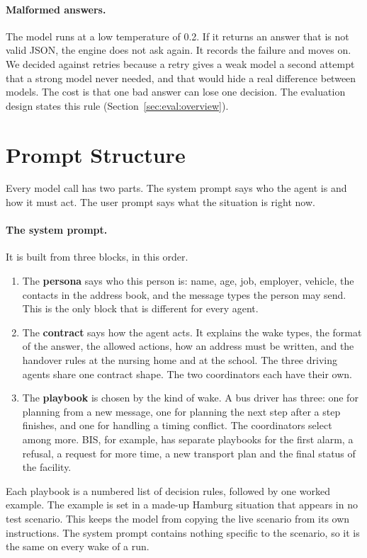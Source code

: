 \paragraph{Malformed answers.} The model runs at a low temperature of 0.2. If
it returns an answer that is not valid JSON, the engine does not ask again. It
records the failure and moves on. We decided against retries because a retry
gives a weak model a second attempt that a strong model never needed, and that
would hide a real difference between models. The cost is that one bad answer
can lose one decision. The evaluation design states this rule
(Section~\ref{sec:eval:overview}).

\section{Prompt Structure}
\label{sec:ag:prompts}

Every model call has two parts. The system prompt says who the agent is and how
it must act. The user prompt says what the situation is right now.

\paragraph{The system prompt.} It is built from three blocks, in this order.
\begin{enumerate}
  \item The \textbf{persona} says who this person is: name, age, job,
  employer, vehicle, the contacts in the address book, and the message types
  the person may send. This is the only block that is different for every
  agent.
  \item The \textbf{contract} says how the agent acts. It explains the wake
  types, the format of the answer, the allowed actions, how an address
  must be written, and the handover rules at the nursing home and at the
  school. The three driving agents share one contract shape. The two
  coordinators each have their own.
  \item The \textbf{playbook} is chosen by the kind of wake. A bus driver has
  three: one for planning from a new message, one for planning the next step
  after a step finishes, and one for handling a timing conflict. The
  coordinators select among more. BIS, for example, has separate playbooks for
  the first alarm, a refusal, a request for more time, a new transport plan
  and the final status of the facility.
\end{enumerate}
Each playbook is a numbered list of decision rules, followed by one worked
example. The example is set in a made-up Hamburg situation that appears in no
test scenario. This keeps the model from copying the live scenario from its own
instructions. The system prompt contains nothing specific to the scenario, so
it is the same on every wake of a run.

